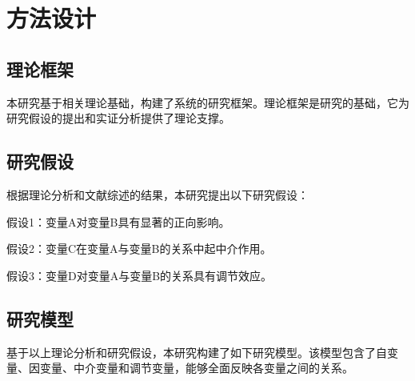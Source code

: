 
\chapter{方法设计}

\section{理论框架}

本研究基于相关理论基础，构建了系统的研究框架。理论框架是研究的基础，它为研究假设的提出和实证分析提供了理论支撑。

\section{研究假设}

根据理论分析和文献综述的结果，本研究提出以下研究假设：

假设1：变量A对变量B具有显著的正向影响。

假设2：变量C在变量A与变量B的关系中起中介作用。

假设3：变量D对变量A与变量B的关系具有调节效应。

\section{研究模型}

基于以上理论分析和研究假设，本研究构建了如下研究模型。该模型包含了自变量、因变量、中介变量和调节变量，能够全面反映各变量之间的关系。
